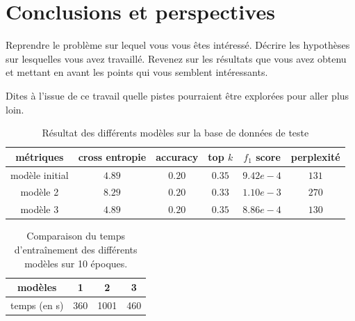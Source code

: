 \documentclass[a4paper]{article}
\begin{document}
\section{Conclusions et perspectives}

Reprendre le problème sur lequel vous vous êtes intéressé. Décrire les hypothèses sur lesquelles vous avez travaillé. Revenez sur les résultats que vous avez obtenu et mettant en avant les points qui vous semblent intéressants.

Dites à l'issue de ce travail quelle pistes pourraient être explorées pour aller plus loin.

\begin{table}
    \centering
    \begin{tabular}{|c|c|c|c|c|c|}
        \hline
        métriques & cross entropie & accuracy & top $k$ & $f_1$ score & perplexité \\
        \hline
        modèle initial & $4.89$ &  $0.20$ & $0.35$ & $9.42e-4$ & $131$ \\
        modèle 2 & $8.29$ &  $0.20$ & $0.33$ & $1.10e-3$ & $270$ \\
        modèle 3 & $4.89$ &  $0.20$ & $0.35$ & $8.86e-4$ & $130$ \\
        \hline
    \end{tabular}
    \caption{Résultat des différents modèles sur la base de données de teste}
    \label{tab:allresults}
\end{table}


\begin{table}
    \centering
    \begin{tabular}{|c|c|c|c|}
        \hline
        modèles & 1 & 2 & 3 \\
        \hline
        temps (en s) & 360 & 1001 & 460 \\
         \hline
    \end{tabular}
    \caption{Comparaison du temps d'entraînement des différents modèles sur 10 époques.}
    \label{tab:times}
\end{table}


\newpage

\printbibliography
\end{document}

